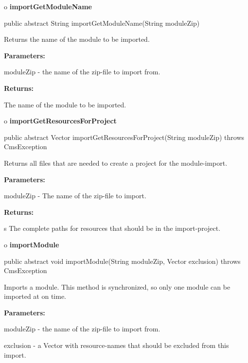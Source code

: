 o {\bf importGetModuleName} 

\begin{PRE}
 public abstract String importGetModuleName(String moduleZip)
\end{PRE}

\begin{description}
\htmlDD Returns the name of the module to be imported. 

\begin{description}
\item {\bf Parameters:}  

moduleZip - the name of the zip-file to import from.  
\item {\bf Returns:}  

The name of the module to be imported.  
\end{description}

\end{description}

o {\bf importGetResourcesForProject} 

\begin{PRE}
 public abstract Vector importGetResourcesForProject(String moduleZip) throws CmsException
\end{PRE}

\begin{description}
\htmlDD Returns all files that are needed to create a project for the
module-import. 

\begin{description}
\item {\bf Parameters:}  

moduleZip - The name of the zip-file to import.  
\item {\bf Returns:}  

s The complete paths for resources that should be in the import-project.  
\end{description}

\end{description}

o {\bf importModule} 

\begin{PRE}
 public abstract void importModule(String moduleZip,
                                   Vector exclusion) throws CmsException
\end{PRE}

\begin{description}
\htmlDD Imports a module. This method is synchronized, so only one module can
be imported at on time. 

\begin{description}
\item {\bf Parameters:}  

moduleZip - the name of the zip-file to import from.  

exclusion - a Vector with resource-names that should be excluded from this
import.  
\end{description}

\end{description}

